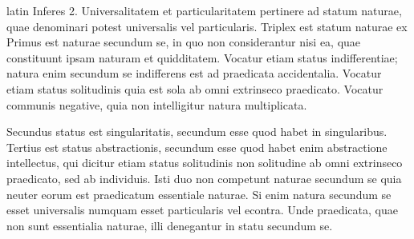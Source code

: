 \begin{otherlanguage*}{latin}
\pstart
Inferes 2. Universalitatem et particularitatem pertinere ad statum naturae, quae denominari potest universalis vel particularis. Triplex est statum naturae ex  Primus est naturae secundum se, in quo non considerantur nisi ea, quae constituunt ipsam naturam et quidditatem. Vocatur etiam status indifferentiae; natura enim secundum se indifferens est ad praedicata accidentalia. Vocatur etiam status solitudinis quia est sola ab omni extrinseco praedicato. Vocatur communis negative, quia non intelligitur natura multiplicata. 
\pend

\pstart
Secundus status est singularitatis, secundum esse quod habet in singularibus. Tertius est status abstractionis, secundum esse quod habet enim abstractione intellectus, qui dicitur etiam status solitudinis non solitudine ab omni extrinseco praedicato, sed ab individuis. Isti duo non competunt naturae secundum se quia neuter eorum est praedicatum essentiale naturae. Si enim natura secundum se esset universalis numquam esset particularis vel econtra. Unde praedicata, quae non sunt essentialia naturae, illi denegantur in statu secundum se. 
\pend

\pstart
{}
\pend


\end{otherlanguage*}
